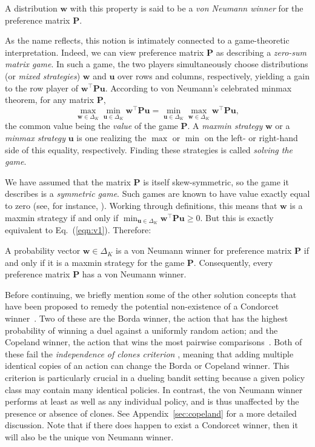 A distribution $\mathbf{w}$ with this property is said to be a {\em von Neumann winner} for the preference matrix $\mathbf{P}$.

As the name reflects, this notion is intimately connected to a game-theoretic interpretation. Indeed, we can view preference matrix $\mathbf{P}$ as describing a
{\em zero-sum matrix game}. In such a game, the two players simultaneously choose distributions (or {\em mixed strategies})
$\mathbf{w}$ and $\mathbf{u}$ over rows and columns, respectively, yielding a gain to the row player of ${\mathbf{w}^{\top}}\mathbf{P}\mathbf{u}$.
According to von Neumann's celebrated minmax theorem, for any matrix $\mathbf{P}$,
\[
  \max_{\mathbf{w}\in\Delta_K} \min_{\mathbf{u}\in\Delta_K}  {\mathbf{w}^{\top}}\mathbf{P}\mathbf{u}
  =
  \min_{\mathbf{u}\in\Delta_K} \max_{\mathbf{w}\in\Delta_K}  {\mathbf{w}^{\top}}\mathbf{P}\mathbf{u},
\]
the common value being the {\em value\/} of the game $\mathbf{P}$.
A {\em maxmin strategy} $\mathbf{w}$ or a {\em minmax strategy} $\mathbf{u}$
is one realizing the $\max$ or $\min$ on the left- or right-hand side of this equality, respectively. Finding these strategies is called {\em solving the game}.

We have assumed that the matrix $\mathbf{P}$ is itself skew-symmetric, so the game it describes is a
{\em symmetric game}. Such games are known to have value exactly equal to zero (see, for instance,
\citealp[Theorem~II.6.2]{owen1995game}).
Working through definitions, this means that $\mathbf{w}$ is a maxmin strategy if and only if $
   \min_{\mathbf{u}\in{\Delta_{K}}}  {\mathbf{w}^{\top}}\mathbf{P}\mathbf{u} \geq 0. $ But this is exactly equivalent to Eq.~(\ref{eqn:v1}). Therefore:

\begin{proposition}  \label{prop:1}
A probability vector $\mathbf{w}\in {\Delta_{K}}$ is a von Neumann winner for preference matrix $\mathbf{P}$ if and only if it is a maxmin strategy for the game $\mathbf{P}$.
Consequently, every preference matrix $\mathbf{P}$ has a von Neumann winner.
\end{proposition}

Before continuing, we briefly mention some of the other solution concepts that have been proposed to remedy the potential non-existence of a Condorcet winner~\citep{schulze11:monotonic}. Two of these are the Borda winner, the action that has the highest probability of winning a duel against a uniformly random action; and the Copeland winner, the action that wins the most pairwise comparisons~\citep{Urvoy:2013}. Both of these fail the \emph{independence of clones criterion} \citep{schulze11:monotonic}, meaning that adding multiple identical copies of an action can change the Borda or Copeland winner. This criterion is particularly crucial in a dueling bandit setting because a given policy class may contain many identical policies. In contrast, the von Neumann winner performs at least as well as any individual policy, and is thus unaffected by the presence or absence of clones. See Appendix~\ref{sec:copeland} for a more detailed discussion. Note that if there does happen to exist a Condorcet winner, then it will also be the unique von Neumann winner.

